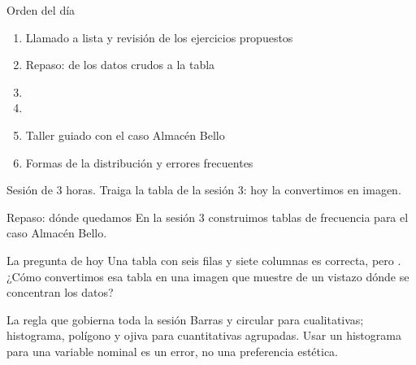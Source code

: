 \documentclass[aspectratio=169,10pt]{beamer}
\begin{document}
\portada

\begin{frame}{Orden del día}
  \begin{enumerate}
    \item Llamado a lista y revisión de los ejercicios propuestos
    \item Repaso: de los datos crudos a la tabla
    \item {}
    \item {}
    \item Taller guiado con el caso Almacén Bello
    \item Formas de la distribución y errores frecuentes
  \end{enumerate}

  \vspace{0.25cm}
  {\footnotesize\color{uniGris} Sesión de 3 horas. Traiga la tabla de la sesión
  3: hoy la convertimos en imagen.}
\end{frame}

\begin{frame}{Repaso: dónde quedamos}
  En la sesión 3 construimos tablas de frecuencia para el caso Almacén Bello.

  \vspace{0.2cm}
  \begin{alertblock}{La pregunta de hoy}
    \footnotesize
    Una tabla con seis filas y siete columnas es correcta, pero
    . ¿Cómo convertimos esa tabla en una
    imagen que muestre de un vistazo dónde se concentran los datos?
  \end{alertblock}

  \vspace{0.2cm}
  \begin{block}{La regla que gobierna toda la sesión}
    \footnotesize
     Barras y circular para
    cualitativas; histograma, polígono y ojiva para cuantitativas agrupadas.
    Usar un histograma para una variable nominal es un error, no una
    preferencia estética.
  \end{block}
\end{frame}
\end{document}

